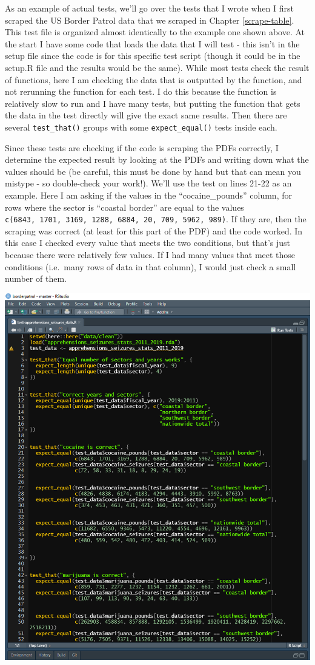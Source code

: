 \documentclass[
  12pt,
]{book}
\begin{document}
As an example of actual tests, we'll go over the tests that I wrote when I first scraped the US Border Patrol data that we scraped in Chapter \ref{scrape-table}. This test file is organized almost identically to the example one shown above. At the start I have some code that loads the data that I will test - this isn't in the setup file since the code is for this specific test script (though it could be in the setup.R file and the results would be the same). While most tests check the result of functions, here I am checking the data that is outputted by the function, and not rerunning the function for each test. I do this because the function is relatively slow to run and I have many tests, but putting the function that gets the data in the test directly will give the exact same results. Then there are several \texttt{test\_that()} groups with some \texttt{expect\_equal()} tests inside each.

Since these tests are checking if the code is scraping the PDFs correctly, I determine the expected result by looking at the PDFs and writing down what the values should be (be careful, this must be done by hand but that can mean you mistype - so double-check your work!). We'll use the test on lines 21-22 as an example. Here I am asking if the values in the ``cocaine\_pounds'' column, for rows where the sector is ``coastal border'' are equal to the values \texttt{c(6843,\ 1701,\ 3169,\ 1288,\ 6884,\ 20,\ 709,\ 5962,\ 989)}. If they are, then the scraping was correct (at least for this part of the PDF) and the code worked. In this case I checked every value that meets the two conditions, but that's just because there were relatively few values. If I had many values that meet those conditions (i.e.~many rows of data in that column), I would just check a small number of them.

\includegraphics{images/test_example.PNG}
\end{document}

